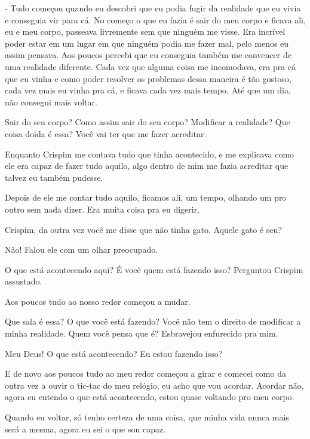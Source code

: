 - Tudo começou quando eu descobri que eu podia fugir da realidade que eu vivia e conseguia vir para cá. No começo o que eu fazia é sair do meu corpo e ficava ali, eu e meu corpo, passeava livremente sem que ninguém me visse. Era incrível poder estar em um lugar em que ninguém podia me fazer mal, pelo menos eu assim pensava. Aos poucos percebi que eu conseguia também me convencer de uma realidade diferente. Cada vez que alguma coisa me incomodava, era pra cá que eu vinha e como poder resolver os problemas dessa maneira é tão gostoso, cada vez mais eu vinha pra cá, e ficava cada vez mais tempo. Até que um dia, não consegui mais voltar.

Sair do seu corpo? Como assim sair do seu corpo? Modificar a realidade? Que coisa doida é essa? Você vai ter que me fazer acreditar.

Enquanto Crispim me contava tudo que tinha acontecido, e me explicava como ele era capaz de fazer tudo aquilo, algo dentro de mim me fazia acreditar que talvez eu também pudesse.

Depois de ele me contar tudo aquilo, ficamos ali, um tempo, olhando um pro outro sem nada dizer. Era muita coisa pra eu digerir.

Crispim, da outra vez você me disse que não tinha gato. Aquele gato é seu?

Não! Falou ele com um olhar preocupado.

O que está acontecendo aqui? É você quem está fazendo isso? Perguntou Crispim assustado.

Aos poucos tudo ao nosso redor começou a mudar.

Que sala é essa? O que você está fazendo? Você não tem o direito de modificar a minha realidade. Quem você pensa que é? Esbravejou enfurecido pra mim.

Meu Deus! O que está acontecendo? Eu estou fazendo isso?

E de novo aos poucos tudo ao meu redor começou a girar e comecei como da outra vez a ouvir o tic-tac do meu relógio, eu acho que vou acordar. Acordar não, agora eu entendo o que está acontecendo, estou quase voltando pro meu corpo.

Quando eu voltar, só tenho certeza de uma coisa, que minha vida nunca mais será a mesma, agora eu sei o que sou capaz.




